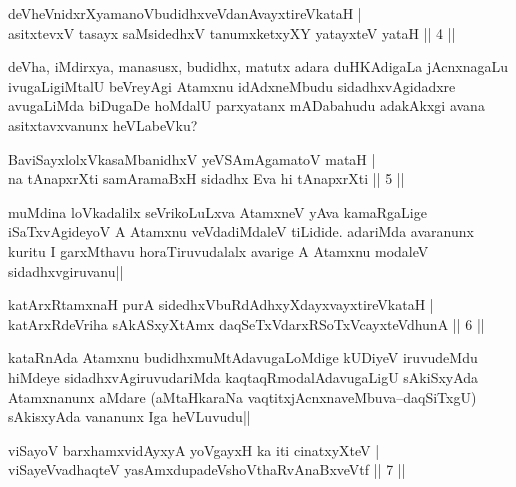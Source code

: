 
\begin{shl}
deVheVnidxrXyamanoVbudidhxveVdanAvayxtireVkataH |\\
asitxtevxV tasayx saMsidedhxV tanumxketxyXY yatayxteV yataH \hfill || 4 ||
\end{shl}

\begin{artha}
deVha, iMdirxya, manasusx, budidhx, matutx adara duHKAdigaLa jAcnxnagaLu ivugaLigiMtalU beVreyAgi Atamxnu idAdxneMbudu sidadhxvAgidadxre avugaLiMda biDugaDe hoMdalU parxyatanx mADabahudu adakAkxgi avana asitxtavxvanunx heVLabeVku?
\end{artha}


\begin{shl}
BaviSayxlolxVkasaMbanidhxV yeVSAmAgamatoV mataH |\\
na tAnapxrXti samAramaBxH sidadhx Eva hi tAnapxrXti \hfill || 5 ||
\end{shl}

\begin{artha}
muMdina loVkadalilx seVrikoLuLxva AtamxneV yAva kamaRgaLige iSaTxvAgideyoV A Atamxnu veVdadiMdaleV tiLidide. adariMda avaranunx kuritu I garxMthavu horaTiruvudalalx avarige A Atamxnu modaleV sidadhxvgiruvanu||
\end{artha}

\begin{shl}
katArxRtamxnaH purA sidedhxVbuRdAdhxyXdayxvayxtireVkataH |\\
katArxRdeVriha sAkASxyXtAmx daqSeTxVdarxRSoTxVcayxteV\s dhunA \hfill || 6 ||
\end{shl}

\begin{artha}
kataRnAda Atamxnu budidhxmuMtAdavugaLoMdige kUDiyeV iruvudeMdu hiMdeye sidadhxvAgiruvudariMda kaqtaqRmodalAdavugaLigU sAkiSxyAda Atamxnanunx aMdare (aMtaHkaraNa vaqtitxjAcnxnaveMbuva--daqSiTxgU) sAkisxyAda vananunx Iga heVLuvudu||
\end{artha}

\begin{shl}
viSayoV barxhamxvidAyxyA yoVgayxH ka iti cinatxyXteV |\\
viSayeV\s vadhaqteV yasAmxdupadeVshoV\s thaRvAnaBxveVtf \hfill || 7 ||
\end{shl}

